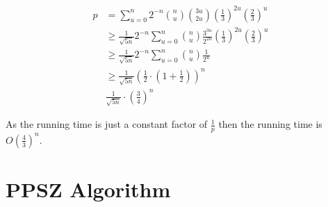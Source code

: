 \documentclass[12pt, a4paper]{article}
\theoremstyle{definition}
\begin{document}
\begin{align}
	p 	&= \sum_{u = 0}^{n} 2^{-n} \binom{n}{u} \binom{3u}{2u} \left( \frac{1}{3} \right)^{2u} \left( \frac{2}{3} \right)^u \\
	 	&\geq \frac{1}{\sqrt{5n}} 2^{-n}\sum_{u = 0}^{n} \binom{n}{u} \frac{3^{3u}}{2^{2u}} \left( \frac{1}{3} \right)^{2u} \left( \frac{2}{3} \right)^u \\
	 	&\geq \frac{1}{\sqrt{5n}} 2^{-n}\sum_{u = 0}^{n} \binom{n}{u} \frac{1}{2^u} \\
	 	&\geq \frac{1}{\sqrt{5n}} \left(\frac{1}{2} \cdot \left(1 + \frac{1}{2} \right) \right)^n \\
	 	& \frac{1}{\sqrt{5n}} \cdot \left( \frac{3}{4} \right)^n
\end{align}

As the running time is just a constant factor of $\frac{1}{p}$ then the running time is $O\left(\frac{4}{3} \right)^n$.
	




\section{PPSZ Algorithm}

\cite{PaturiA98}






\end{document}
